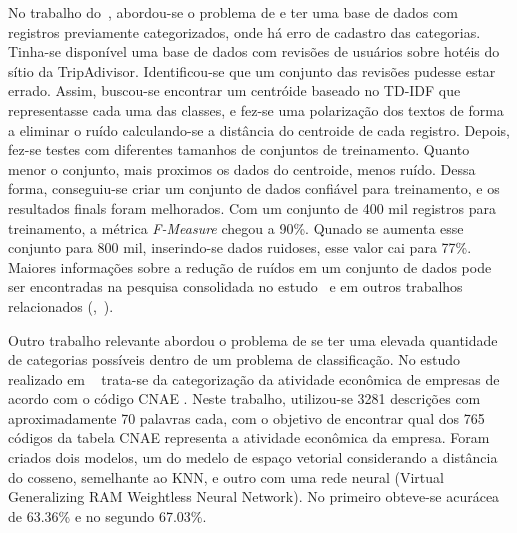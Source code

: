 





No trabalho do~\cite{tripadivisor}, abordou-se o problema de e ter uma base de dados com registros previamente categorizados, onde há erro de cadastro das categorias. 
Tinha-se disponível uma base de dados com revisões de usuários sobre hotéis do sítio da TripAdivisor.
Identificou-se que um conjunto das revisões pudesse estar errado. Assim, buscou-se encontrar um centróide baseado no TD-IDF que representasse cada uma das classes, e fez-se uma polarização dos textos de forma a eliminar o ruído calculando-se a distância do centroide de cada registro. Depois, fez-se testes com diferentes tamanhos de conjuntos de treinamento. Quanto menor o conjunto, mais proximos os dados do centroide, menos ruído. Dessa forma, conseguiu-se criar um conjunto de dados confiável para treinamento, e os resultados finals foram melhorados. Com um conjunto de 400 mil registros para treinamento, a métrica \textit{F-Measure }chegou a 90\%. Qunado se aumenta esse conjunto para 800 mil, inserindo-se dados ruidoses, esse valor cai para 77\%. Maiores informações sobre a redução de ruídos em um conjunto de dados pode ser encontradas na pesquisa consolidada no estudo~\cite{mislabeled_survey} e em outros trabalhos relacionados (\cite{liu_preprocessing_2017},~\cite{svmop}).



Outro trabalho relevante abordou o problema de se ter uma elevada quantidade de categorias possíveis dentro de um problema de classificação. No estudo realizado em ~\cite{oliveira_intelligent_nodate} trata-se da categorização da atividade econômica de empresas de acordo com o código CNAE . Neste trabalho, utilizou-se 3281 descrições com aproximadamente 70 palavras cada, com o objetivo de encontrar qual dos 765 códigos da tabela CNAE representa a atividade econômica da empresa. Foram criados dois modelos, um do medelo de espaço vetorial considerando a distância do cosseno, semelhante ao KNN, e outro com uma rede neural (Virtual  Generalizing RAM Weightless Neural Network). 
No primeiro obteve-se acurácea de 63.36\% e no segundo 67.03\%.
\cite{mencia_efficient_2008}

